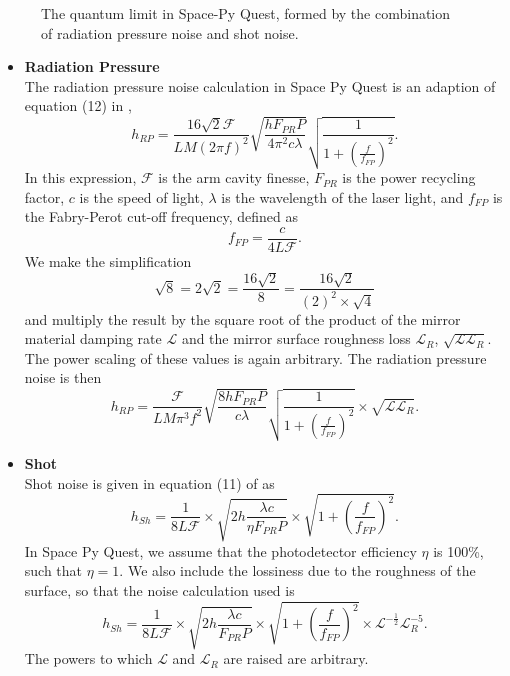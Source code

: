 \documentclass{article}
\begin{document}
\begin{itemize}
\begin{figure}[h!]
    \caption{The quantum limit in Space-Py Quest, formed by the combination of radiation pressure noise and shot noise.}
    \label{fig:quantum}
    \end{figure}
    \begin{itemize}
        \item \textbf{Radiation Pressure} \\
    The radiation pressure noise calculation in Space Py Quest is an
    adaption of equation (12) in \cite{VIRGO}, 
    \[
    h_{RP} = \frac{16\sqrt{2}\mathcal{F}}{LM(2\pi f)^2}\sqrt{\frac{hF_{PR}P}{4\pi^2c\lambda}}\sqrt{\frac{1}{1 + \left(\frac{f}{f_{FP}}\right)^2}}.
    \]
    In this expression, $\mathcal{F}$ is the arm cavity finesse,
    $F_{PR}$ is the power recycling factor, $c$ is the speed of light,
    $\lambda$ is the wavelength of the laser light, and $f_{FP}$ is
    the Fabry-Perot cut-off frequency, defined as
    \begin{equation}
        f_{FP} = \frac{c}{4L\mathcal{F}}.
    \end{equation}
    We make the simplification
    \[
    \sqrt{8} = 2\sqrt{2} = \frac{16 \sqrt{2}}{8} = \frac{16 \sqrt{2}}{(2)^2 \times \sqrt{4}}
    \]
   and multiply the result by the square root of the product of the
   mirror material damping rate $\mathcal{L}$ and the mirror surface
   roughness loss $\mathcal{L}_R$,
   $\sqrt{\mathcal{L}\mathcal{L}_R}$. The power scaling of these
   values is again arbitrary. The radiation pressure noise is then
    \begin{equation}
    \label{eqn::radiation}
    h_{RP} = \frac{\mathcal{F}}{LM\pi^3f^2}\sqrt{\frac{8hF_{PR}P}{c\lambda}}\sqrt{\frac{1}{1 + \left(\frac{f}{f_{FP}}\right)^2}} \times \sqrt{\mathcal{L}\mathcal{L}_R}.
    \end{equation}
  
    \item \textbf{Shot} \\
    Shot noise is given in equation (11) of \cite{VIRGO} as
    \begin{equation}
    h_{Sh} = \frac{1}{8L\mathcal{F}}\times\sqrt{2h\frac{\lambda c}{\eta F_{PR}P}}\times\sqrt{1 + \left(\frac{f}{f_{FP}}\right)^2}.
    \end{equation}
    In Space Py Quest, we assume that the photodetector efficiency
    $\eta$ is 100\%, such that $\eta = 1$. We also include the
    lossiness due to the roughness of the surface, so that the noise
    calculation used is
    \begin{equation}
    \label{eqn::shot}
    h_{Sh} = \frac{1}{8L\mathcal{F}}\times\sqrt{2h\frac{\lambda c}{F_{PR}P}}\times\sqrt{1 + \left(\frac{f}{f_{FP}}\right)^2}\times\mathcal{L}^{-\frac{1}{2}}\mathcal{L}_R^{-5}.
    \end{equation}
    The powers to which $\mathcal{L}$ and $\mathcal{L}_R$ are raised are arbitrary.
    \end{itemize}
\end{itemize}
\end{document}
